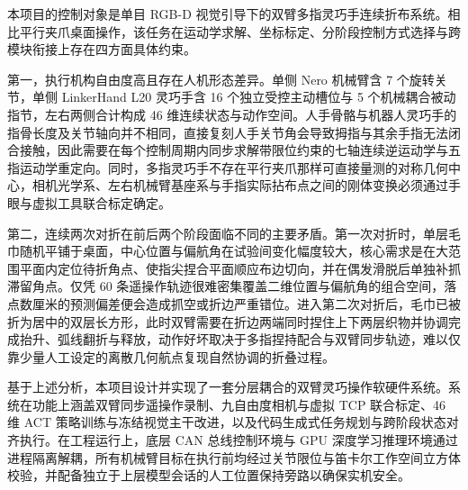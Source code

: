 本项目的控制对象是单目 RGB-D 视觉引导下的双臂多指灵巧手连续折布系统。相比平行夹爪桌面操作，该任务在运动学求解、坐标标定、分阶段控制方式选择与跨模块衔接上存在四方面具体约束。

第一，执行机构自由度高且存在人机形态差异。单侧 Nero 机械臂含 7 个旋转关节，单侧 LinkerHand L20 灵巧手含 16 个独立受控主动槽位与 5 个机械耦合被动指节，左右两侧合计构成 46 维连续状态与动作空间。人手骨骼与机器人灵巧手的指骨长度及关节轴向并不相同，直接复刻人手关节角会导致拇指与其余手指无法闭合接触，因此需要在每个控制周期内同步求解带限位约束的七轴连续逆运动学与五指运动学重定向。同时，多指灵巧手不存在平行夹爪那样可直接量测的对称几何中心，相机光学系、左右机械臂基座系与手指实际拈布点之间的刚体变换必须通过手眼与虚拟工具联合标定确定。

第二，连续两次对折在前后两个阶段面临不同的主要矛盾。第一次对折时，单层毛巾随机平铺于桌面，中心位置与偏航角在试验间变化幅度较大，核心需求是在大范围平面内定位待折角点、使指尖捏合平面顺应布边切向，并在偶发滑脱后单独补抓滞留角点。仅凭 60 条遥操作轨迹很难密集覆盖二维位置与偏航角的组合空间，落点数厘米的预测偏差便会造成抓空或折边严重错位。进入第二次对折后，毛巾已被折为居中的双层长方形，此时双臂需要在折边两端同时捏住上下两层织物并协调完成抬升、弧线翻折与释放，动作好坏取决于多指捏持配合与双臂同步轨迹，难以仅靠少量人工设定的离散几何航点复现自然协调的折叠过程。

基于上述分析，本项目设计并实现了一套分层耦合的双臂灵巧操作软硬件系统。系统在功能上涵盖双臂同步遥操作录制、九自由度相机与虚拟 TCP 联合标定、46 维 ACT 策略训练与冻结视觉主干改进，以及代码生成式任务规划与跨阶段状态对齐执行。在工程运行上，底层 CAN 总线控制环境与 GPU 深度学习推理环境通过进程隔离解耦，所有机械臂目标在执行前均经过关节限位与笛卡尔工作空间立方体校验，并配备独立于上层模型会话的人工位置保持旁路以确保实机安全。
